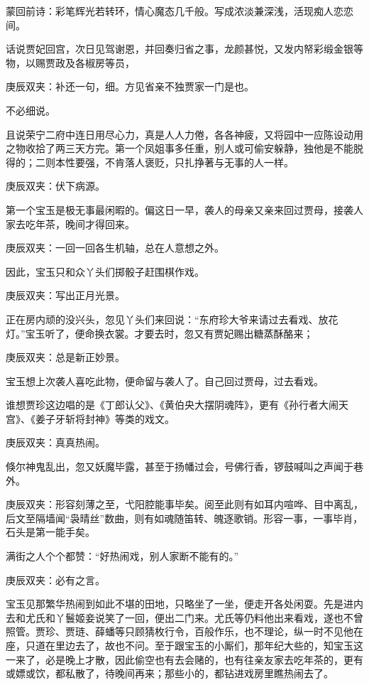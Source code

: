 

\begin{parag}
    \begin{note}蒙回前诗：彩笔辉光若转环，情心魔态几千般。写成浓淡兼深浅，活现痴人恋恋间。\end{note}
\end{parag}


\begin{parag}
    话说贾妃回宫，次日见驾谢恩，并回奏归省之事，龙颜甚悦，又发内帑彩缎金银等物，以赐贾政及各椒房等员，\begin{note}庚辰双夹：补还一句，细。方见省亲不独贾家一门是也。\end{note}不必细说。
\end{parag}


\begin{parag}
    且说荣宁二府中连日用尽心力，真是人人力倦，各各神疲，又将园中一应陈设动用之物收拾了两三天方完。第一个凤姐事多任重，别人或可偷安躲静，独他是不能脱得的；二则本性要强，不肯落人褒贬，只扎挣著与无事的人一样。\begin{note}庚辰双夹：伏下病源。\end{note}第一个宝玉是极无事最闲暇的。偏这日一早，袭人的母亲又亲来回过贾母，接袭人家去吃年茶，晚间才得回来。\begin{note}庚辰双夹：一回一回各生机轴，总在人意想之外。\end{note}因此，宝玉只和众丫头们掷骰子赶围棋作戏。\begin{note}庚辰双夹：写出正月光景。\end{note}正在房内顽的没兴头，忽见丫头们来回说：“东府珍大爷来请过去看戏、放花灯。”宝玉听了，便命换衣裳。才要去时，忽又有贾妃赐出糖蒸酥酪来；\begin{note}庚辰双夹：总是新正妙景。\end{note}宝玉想上次袭人喜吃此物，便命留与袭人了。自己回过贾母，过去看戏。
\end{parag}


\begin{parag}
    谁想贾珍这边唱的是《丁郎认父》、《黄伯央大摆阴魂阵》，更有《孙行者大闹天宫》、《姜子牙斩将封神》等类的戏文。\begin{note}庚辰双夹：真真热闹。\end{note}倏尔神鬼乱出，忽又妖魔毕露，甚至于扬幡过会，号佛行香，锣鼓喊叫之声闻于巷外。\begin{note}庚辰双夹：形容刻薄之至，弋阳腔能事毕矣。阅至此则有如耳内喧哗、目中离乱，后文至隔墙闻“袅晴丝”数曲，则有如魂随笛转、魄逐歌销。形容一事，一事毕肖，石头是第一能手矣。\end{note}满街之人个个都赞：“好热闹戏，别人家断不能有的。”\begin{note}庚辰双夹：必有之言。\end{note}宝玉见那繁华热闹到如此不堪的田地，只略坐了一坐，便走开各处闲耍。先是进内去和尤氏和丫鬟姬妾说笑了一回，便出二门来。尤氏等仍料他出来看戏，遂也不曾照管。贾珍、贾琏、薛蟠等只顾猜枚行令，百般作乐，也不理论，纵一时不见他在座，只道在里边去了，故也不问。至于跟宝玉的小厮们，那年纪大些的，知宝玉这一来了，必是晚上才散，因此偷空也有去会赌的，也有往亲友家去吃年茶的，更有或嫖或饮，都私散了，待晚间再来；那些小的，都钻进戏房里瞧热闹去了。
\end{parag}


